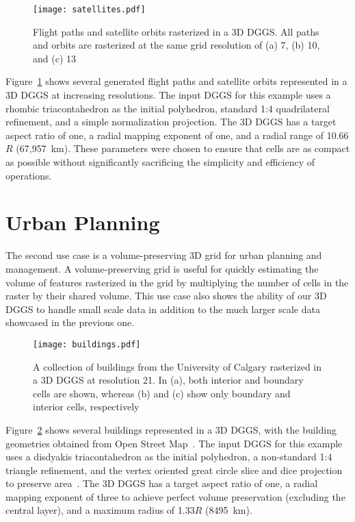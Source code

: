 \begin{figure}[h]
	\centering
	\texttt{[image: satellites.pdf]}
	\caption[Flight path and satellite orbit use case showing several sample trajectories]{
		Flight paths and satellite orbits rasterized in a 3D DGGS.
		All paths and orbits are rasterized at the same grid resolution of (a) 7, (b) 10, and (c) 13
	}
	\label{fig:satellites}
\end{figure}


Figure~\ref{fig:satellites} shows several generated flight paths and satellite orbits represented in a 3D DGGS at increasing resolutions.
The input DGGS for this example uses a rhombic triacontahedron as the initial polyhedron, standard 1:4 quadrilateral refinement, and a simple normalization projection.
The 3D DGGS has a target aspect ratio of one, a radial mapping exponent of one, and a radial range of 10.66$R$ (67,957~km).
These parameters were chosen to ensure that cells are as compact as possible without significantly sacrificing the simplicity and efficiency of operations.

\section{Urban Planning}
The second use case is a volume-preserving 3D grid for urban planning and management.
A volume-preserving grid is useful for quickly estimating the volume of features rasterized in the grid by multiplying the number of cells in the raster by their shared volume.
This use case also shows the ability of our 3D DGGS to handle small scale data in addition to the much larger scale data showcased in the previous one.


\begin{figure}[h]
	\centering
	\texttt{[image: buildings.pdf]}
	\caption[Urban planning use case showing various rasterized buildings]{
		A collection of buildings from the University of Calgary rasterized in a 3D DGGS at resolution 21.
		In (a), both interior and boundary cells are shown, whereas (b) and (c) show only boundary and interior cells, respectively
	}
	\label{fig:urbanplanning}
\end{figure}


Figure~\ref{fig:urbanplanning} shows several buildings represented in a 3D DGGS, with the building geometries obtained from Open Street Map~\cite{osm}.
The input DGGS for this example uses a disdyakis triacontahedron as the initial polyhedron, a non-standard 1:4 triangle refinement, and the vertex oriented great circle slice and dice projection~\cite{van2006slice} to preserve area~\cite{hallDT}.
The 3D DGGS has a target aspect ratio of one, a radial mapping exponent of three to achieve perfect volume preservation (excluding the central layer), and a maximum radius of 1.33$R$ (8495~km).


